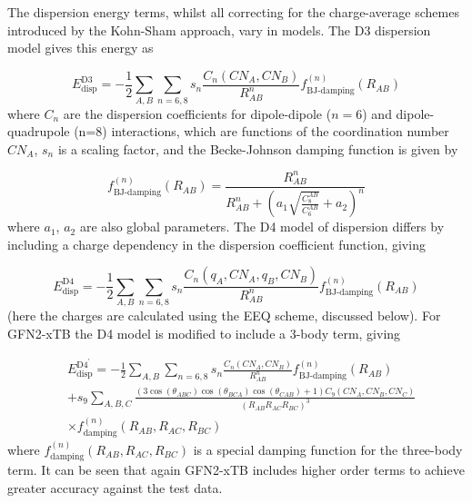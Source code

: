 The dispersion energy terms, whilst all correcting for the charge-average schemes
introduced by the Kohn-Sham approach, vary in models. The D3 dispersion model gives
this energy as

\begin{equation}
    E^{\text{D3}}_\text{disp} = -\frac{1}{2}\sum_{A,B}\sum_{n=6,8} s_n \frac{C_n\left(CN_A, CN_B\right)}{R^n_{AB}} f^{\left(n\right)}_{\text{BJ-damping}} \left(R_{AB}\right)
\end{equation}
%
where $C_n$ are the dispersion coefficients for dipole-dipole ($n=6$) and dipole-quadrupole
(n=8) interactions, which are functions of the coordination number $CN_A$, $s_n$
is a scaling factor, and the Becke-Johnson damping function \cite{Johnson2005, Becke2005} 
is given by

\begin{equation}
    f^{\left(n\right)}_{\text{BJ-damping}}\left(R_{AB}\right) = \frac{R^n_{AB}}{R^n_{AB} + \left(a_1 \sqrt{\frac{C_8^{AB}}{C_6^{AB}}} + a_2 \right)^n} 
\end{equation}
%
where $a_1$, $a_2$ are also global parameters. The D4 model of dispersion differs
by including a charge dependency in the dispersion coefficient function, giving

\begin{equation}
    E^{\text{D4}}_\text{disp} = -\frac{1}{2}\sum_{A,B}\sum_{n=6,8} s_n \frac{C_n\left(q_A, CN_A, q_B, CN_B\right)}{R^n_{AB}} f^{\left(n\right)}_{\text{BJ-damping}} \left(R_{AB}\right)
\end{equation}
%
(here the charges are calculated using the EEQ scheme, discussed below). For GFN2-xTB
the D4 model is modified to include a 3-body term, giving

\begin{equation}
    \begin{split}
    &E^{\text{D4}^{\prime}}_\text{disp} = -\frac{1}{2}\sum_{A,B}\sum_{n=6,8} s_n \frac{C_n\left(CN_A, CN_B\right)}{R^n_{AB}} f^{\left(n\right)}_{\text{BJ-damping}} \left(R_{AB}\right) \\
    & + s_9 \sum_{A,B,C} \frac{\left(3\cos\left(\theta_{ABC}\right)\cos\left(\theta_{BCA}\right)\cos\left(\theta_{CAB}\right)+1\right) C_9 \left(CN_A, CN_B, CN_C\right)}{\left(R_{AB}R_{AC}R_{BC}\right)^3} \\
    & \times f^{\left(n\right)}_{\text{damping}} \left(R_{AB}, R_{AC}, R_{BC}\right)
    \end{split}
\end{equation}
%
where $f^{\left(n\right)}_{\text{damping}} \left(R_{AB}, R_{AC}, R_{BC}\right)$ is
a special damping function for the three-body term. It can be seen that again GFN2-xTB 
includes higher order terms to achieve greater accuracy against the test data.

